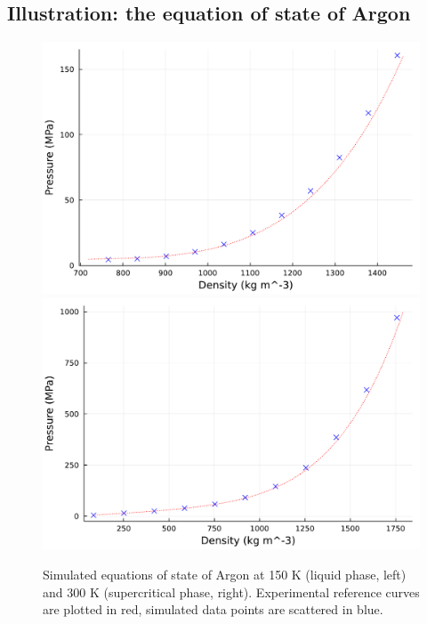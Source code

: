 \subsection{Illustration: the equation of state of Argon}
\begin{figure}[htbp]
    \begin{center}
      \includegraphics[width=0.49\linewidth]{figures/chapter1/argon_nvt_150K.pdf}
      \includegraphics[width=0.49\linewidth]{figures/chapter1/argon_nvt_300K.pdf}
      \caption{ \label{fig:eos_argon}
        Simulated equations of state of Argon at 150 K (liquid phase, left) and 300 K (supercritical phase, right). Experimental reference curves are plotted in red, simulated data points are scattered in blue.
      }
    \end{center}
  \end{figure}
